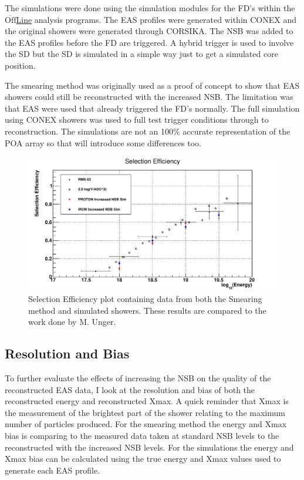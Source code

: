 The simulations were done using the simulation modules for the FD's within the $\overline{\mathrm{Off}}$\underline{Line} analysis programs. The EAS profiles were generated within CONEX and the original showers were generated through CORSIKA. The NSB was added to the EAS profiles before the FD are triggered. A hybrid trigger is used to involve the SD but the SD is simulated in a simple way just to get a simulated core position.

The smearing method was originally used as a proof of concept to show that EAS showers could still be reconstructed with the increased NSB. The limitation was that EAS were used that already triggered the FD's normally. The full simulation using CONEX showers was used to full test trigger conditions through to reconstruction. The simulations are not an 100\% accurate representation of the POA array so that will introduce some differences too.


\begin{figure}[!hp]
\centering
\includegraphics[width=\textwidth]{chapters/graphs/SelectionEff/SelectionEff_errorbars_10timesNSB.pdf}
\caption{Selection Efficiency plot containing data from both the Smearing method and simulated showers. These results are compared to the work done by M. Unger.}
\end{figure}

\subsection{Resolution and Bias}

To further evaluate the effects of increasing the NSB on the quality of the reconstructed EAS data, I look at the resolution and bias of both the reconstructed energy and reconstructed Xmax. A quick reminder that Xmax is the measurement of the brightest part of the shower relating to the maximum number of particles produced. For the smearing method the energy and Xmax bias is comparing to the measured data taken at standard NSB levels to the reconstructed with the increased NSB levels. For the simulations the energy and Xmax bias can be calculated using the true energy and Xmax values used to generate each EAS profile.

